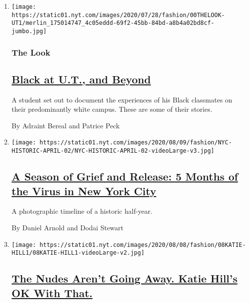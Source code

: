 \begin{enumerate}
\def\labelenumi{\arabic{enumi}.}
\item
  \texttt{[image: https://static01.nyt.com/images/2020/07/28/fashion/00THELOOK-UT1/merlin\_175014747\_4c05eddd-69f2-45bb-84bd-a8b4a02bd8cf-jumbo.jpg]}

  \hypertarget{the-look}{%
  \subsubsection{The Look}\label{the-look}}

  \hypertarget{black-at-ut-and-beyond}{%
  \subsection{\texorpdfstring{\href{/2020/08/08/style/black-yearbook-university-texas-austin.html}{Black
  at U.T., and
  Beyond}}{Black at U.T., and Beyond}}\label{black-at-ut-and-beyond}}

  A student set out to document the experiences of his Black classmates
  on their predominantly white campus. These are some of their stories.

  By Adraint Bereal and Patrice Peck
\item
  \texttt{[image: https://static01.nyt.com/images/2020/08/09/fashion/NYC-HISTORIC-APRIL-02/NYC-HISTORIC-APRIL-02-videoLarge-v3.jpg]}

  \hypertarget{a-season-of-grief-and-release-5-months-of-the-virus-in-new-york-city}{%
  \subsection{\texorpdfstring{\href{/2020/08/07/style/coronavirus-nyc-historic-season.html}{A
  Season of Grief and Release: 5 Months of the Virus in New York
  City}}{A Season of Grief and Release: 5 Months of the Virus in New York City}}\label{a-season-of-grief-and-release-5-months-of-the-virus-in-new-york-city}}

  A photographic timeline of a historic half-year.

  By Daniel Arnold and Dodai Stewart
\item
  \texttt{[image: https://static01.nyt.com/images/2020/08/08/fashion/08KATIE-HILL1/08KATIE-HILL1-videoLarge-v2.jpg]}

  \hypertarget{the-nudes-arent-going-away-katie-hills-ok-with-that}{%
  \subsection{\texorpdfstring{\href{/2020/08/08/style/katie-hill-she-will-rise-revenge-porn.html}{The
  Nudes Aren't Going Away. Katie Hill's OK With
  That.}}{The Nudes Aren't Going Away. Katie Hill's OK With That.}}\label{the-nudes-arent-going-away-katie-hills-ok-with-that}}


\end{enumerate}
